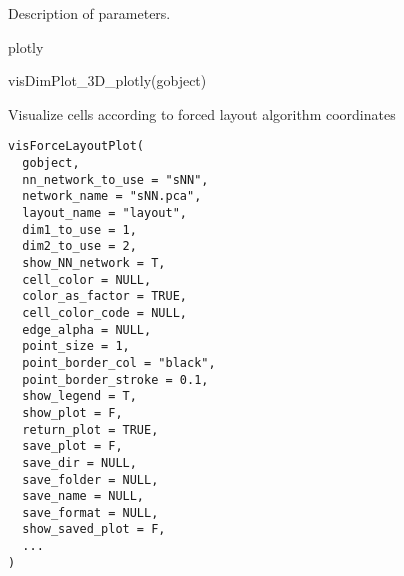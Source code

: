 \documentclass[a4paper]{book}
\begin{document}
%
\begin{Details}\relax
Description of parameters.
\end{Details}
%
\begin{Value}
plotly
\end{Value}
%
\begin{Examples}
\begin{ExampleCode}
    visDimPlot_3D_plotly(gobject)
\end{ExampleCode}
\end{Examples}
%
\begin{Description}\relax
Visualize cells according to forced layout algorithm coordinates
\end{Description}
%
\begin{Usage}
\begin{verbatim}
visForceLayoutPlot(
  gobject,
  nn_network_to_use = "sNN",
  network_name = "sNN.pca",
  layout_name = "layout",
  dim1_to_use = 1,
  dim2_to_use = 2,
  show_NN_network = T,
  cell_color = NULL,
  color_as_factor = TRUE,
  cell_color_code = NULL,
  edge_alpha = NULL,
  point_size = 1,
  point_border_col = "black",
  point_border_stroke = 0.1,
  show_legend = T,
  show_plot = F,
  return_plot = TRUE,
  save_plot = F,
  save_dir = NULL,
  save_folder = NULL,
  save_name = NULL,
  save_format = NULL,
  show_saved_plot = F,
  ...
)
\end{verbatim}
\end{Usage}
%
\end{document}
